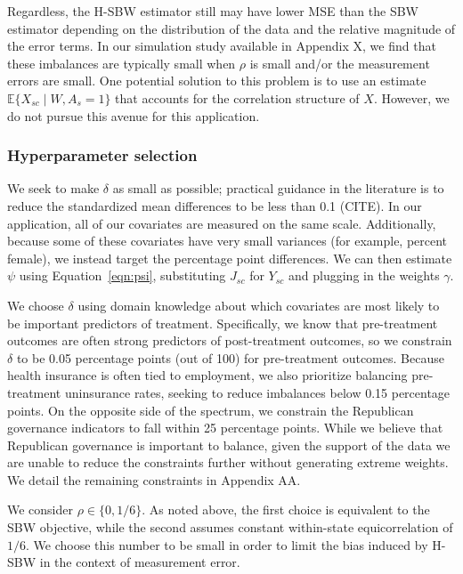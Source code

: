 \documentclass[aoas]{imsart}
\theoremstyle{plain}
\theoremstyle{remark}
\begin{document}
Regardless, the H-SBW estimator still may have lower MSE than the SBW estimator depending on the distribution of the data and the relative magnitude of the error terms. In our simulation study available in Appendix X, we find that these imbalances are typically small when $\rho$ is small and/or the measurement errors are small. One potential solution to this problem is to use an estimate $\mathbb{E}\{X_{sc} \mid W, A_s = 1\}$ that accounts for the correlation structure of $X$. However, we do not pursue this avenue for this application.

\subsubsection{Hyperparameter selection}

We seek to make $\delta$ as small as possible; practical guidance in the literature is to reduce the standardized mean differences to be less than 0.1 (CITE). In our application, all of our covariates are measured on the same scale. Additionally, because some of these covariates have very small variances (for example, percent female), we instead target the percentage point differences. We can then estimate $\psi$ using Equation~\ref{eqn:psi}, substituting $J_{sc}$ for $Y_{sc}$ and plugging in the weights $\gamma$.

We choose $\delta$ using domain knowledge about which covariates are most likely to be important predictors of treatment. Specifically, we know that pre-treatment outcomes are often strong predictors of post-treatment outcomes, so we constrain $\delta$ to be 0.05 percentage points (out of 100) for pre-treatment outcomes. Because health insurance is often tied to employment, we also prioritize balancing pre-treatment uninsurance rates, seeking to reduce imbalances below 0.15 percentage points. On the opposite side of the spectrum, we constrain the Republican governance indicators to fall within 25 percentage points. While we believe that Republican governance is important to balance, given the support of the data we are unable to reduce the constraints further without generating extreme weights. We detail the remaining constraints in Appendix AA. 

We consider $\rho \in \{0, 1/6\}$. As noted above, the first choice is equivalent to the SBW objective, while the second assumes constant within-state equicorrelation of $1/6$. We choose this number to be small in order to limit the bias induced by H-SBW in the context of measurement error.
\end{document}
